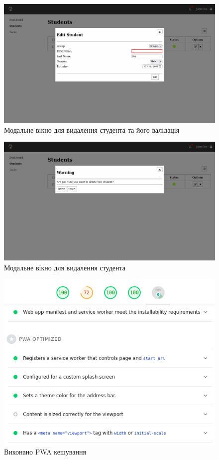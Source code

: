 \documentclass{article}
\begin{document}
\begin{normalsize}
\begin{figure}[H]
	\centering
	\includegraphics[scale=0.35]{6}
	\caption{Модальне вікно для видалення студента та його валідація}
\end{figure}

\begin{figure}[H]
	\centering
	\includegraphics[scale=0.35]{7}
	\caption{Модальне вікно для видалення студента}
\end{figure}

\begin{figure}[H]
	\centering
	\includegraphics[scale=0.5]{10}
	\caption{Виконано PWA кешування}
\end{figure}


\end{normalsize}
\end{document}
